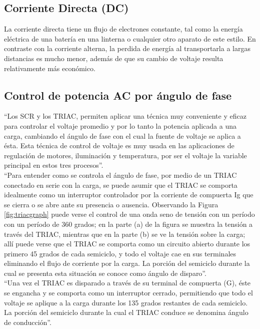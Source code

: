 \subsection{Corriente Directa (DC)}

La corriente directa tiene un flujo de electrones constante, tal como la energía eléctrica de una batería en una linterna o cualquier otro aparato de este estilo. En contraste con la corriente alterna, la perdida de energía al transportarla a largas distancias es mucho menor, además de que su cambio de voltaje resulta relativamente más económico. \cite{Cor}\\

\subsection{Control de potencia AC por ángulo de fase}

``Los SCR y los TRIAC, permiten aplicar una técnica muy conveniente y eficaz para controlar el voltaje promedio y por lo tanto la potencia aplicada a una carga, cambiando el ángulo de fase con el cual la fuente de voltaje se aplica a ésta. Esta técnica de control de voltaje es muy usada en las aplicaciones de regulación de motores, iluminación y temperatura, por ser el voltaje la variable principal en estos tres procesos''.\cite{CEKIT}\\

``Para entender como se controla el ángulo de fase, por medio de un TRIAC conectado en serie con la carga, se puede asumir que el TRIAC se comporta idealmente como un interruptor controlador por la corriente de compuerta Ig que se cierra o se abre ante su presencia o ausencia. Observando la Figura \ref{fig:triacgraph} puede verse el control de una onda seno de tensión con un período con un período de 360 grados; en la parte (a) de la figura se muestra la tensión a través del TRIAC, mientras que en la parte (b) se ve la tensión sobre la carga; allí puede verse que el TRIAC se comporta como un circuito abierto durante los primero 45 grados de cada semiciclo, y todo el voltaje cae en sus terminales eliminando el flujo de corriente por la carga. La porción del semiciclo durante la cual se presenta esta situación se conoce como ángulo de disparo''\cite{CEKIT}.\\

``Una vez el TRIAC es disparado a través de su terminal de compuerta (G), éste se engancha y se comporta como un interruptor cerrado, permitiendo que todo el voltaje se aplique a la carga durante los 135 grados restantes de cada semiciclo. La porción del semiciclo durante la cual el TRIAC conduce se denomina ángulo de conducción''\cite{CEKIT}.


